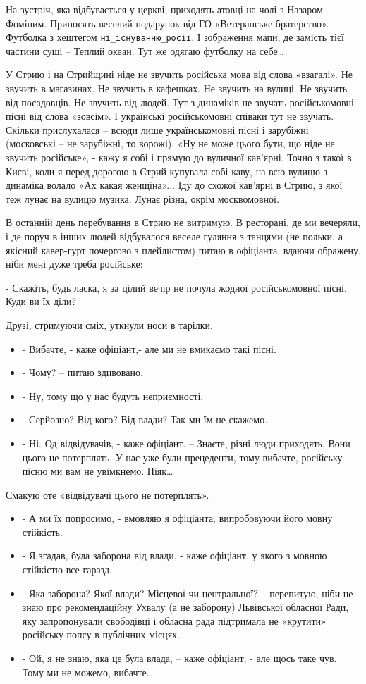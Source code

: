 На зустріч, яка відбувається у церкві, приходять атовці на чолі з Назаром
Фоміним. Приносять веселий подарунок від ГО «Ветеранське братерство». Футболка
з хештегом \verb|ні_існуванню_росії|. І зображення мапи, де замість тієї частини суші
– Теплий океан. Тут же одягаю футболку на себе… 

У Стрию і на Стрийщині ніде не звучить російська мова від слова «взагалі». Не
звучить в магазинах. Не звучить в кафешках. Не звучить на вулиці. Не звучить
від посадовців. Не звучить від людей. Тут з динаміків не звучать російськомовні
пісні від слова «зовсім». І українські російськомовні співаки тут не звучать.
Скільки прислухалася – всюди лише українськомовні пісні і зарубіжні (московські
– не зарубіжні, то ворожі). «Ну не може цього бути, що ніде не звучить
російське», - кажу я собі і прямую до вуличної кав’ярні. Точно з такої в Києві,
коли я перед дорогою в Стрий купувала собі каву, на всю вулицю з динаміка
волало «Ах какая женщіна»... Іду до схожої кав’ярні в Стрию, з якої теж лунає
на вулицю музика. Лунає різна, окрім москвомовної. 

В останній день перебування в Стрию не витримую. В ресторані, де ми вечеряли, і
де поруч в інших людей відбувалося веселе гуляння з танцями (не польки, а
якісний кавер-гурт почергово з  плейлистом) питаю в офіціанта, вдаючи ображену,
ніби мені дуже треба російське: 

- Скажіть, будь ласка, я за цілий вечір не почула жодної російськомовної пісні. Куди ви їх діли?

Друзі, стримуючи сміх, уткнули носи в тарілки.

\begin{itemize}
  \item - Вибачте, - каже офіціант,- але ми не вмикаємо такі пісні.
  \item - Чому? – питаю здивовано.
  \item - Ну, тому що у нас будуть неприємності. 
  \item - Серйозно? Від кого? Від влади? Так ми їм не скажемо.
  \item - Ні. Од відвідувачів, - каже офіціант. – Знаєте, різні люди приходять. Вони цього не потерплять. У нас уже були прецеденти, тому вибачте, російську пісню ми вам не увімкнемо. Ніяк… 
\end{itemize}

Смакую оте «відвідувачі цього не потерплять». 

\begin{itemize}
  \item - А ми їх попросимо, - вмовляю я офіціанта, випробовуючи його мовну стійкість.
  \item - Я згадав, була заборона від влади, - каже офіціант, у якого з мовною стійкістю все гаразд.
  \item - Яка заборона? Якої влади? Місцевої чи центральної? – перепитую, ніби не знаю про рекомендаційну Ухвалу (а не заборону) Львівської  обласної Ради, яку запропонували свободівці і обласна рада підтримала не «крутити» російську попсу в публічних місцях. 
  \item - Ой, я не знаю, яка це була влада, – каже офіціант, - але щось таке чув. Тому ми не можемо, вибачте…
\end{itemize}

